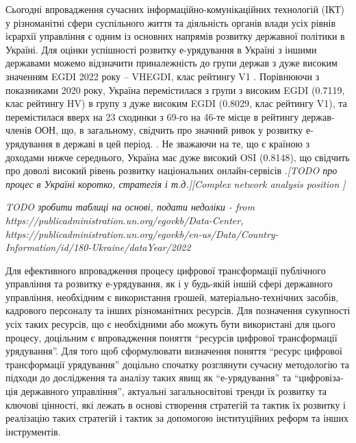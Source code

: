 Сьогодні впровадження сучасних інформаційно-комунікаційних технологій (ІКТ) у різноманітні сфери суспільного життя та діяльність органів влади усіх рівнів ієрархії управління є одним із основних напрямів розвитку державної політики в Україні. Для оцінки успішності розвитку е-урядування в Україні з іншими державами можемо відзначити приналежність до групи держав з дуже високим значенням EGDI 2022 року -- VHEGDI, клас рейтингу V1 \cite{online:egdi}. Порівнюючи з показниками 2020 року, Україна перемістилася з групи з високим EGDI (0.7119, клас рейтингу HV) в групу з дуже високим EGDI (0.8029, клас рейтингу V1), та перемістилася вверх на 23 сходинки з 69-го на 46-те місце в рейтингу держав-членів ООН, що, в загальному, свідчить про значний ривок у розвитку е-урядування в державі в цей період. \cite[36]{book:un_e_govt_survey_2022}. Не зважаючи на те, що є країною з доходами нижче середнього, Україна має дуже високий OSI (0.8148), що свідчить про доволі високий рівень розвитку національних онлайн-сервісів \cite[44]{book:un_e_govt_survey_2022}\cite{online:egdi}.\textit{[TODO про процес в Україні коротко, стратегія і т.д.]}\textit{[Complex network analysis position \cite[47]{book:un_e_govt_survey_2022}]}

\textit{TODO зробити таблиці на основі, подати недоліки - from https://publicadministration.un.org/egovkb/Data-Center, https://publicadministration.un.org/egovkb/en-us/Data/Country-Information/id/180-Ukraine/dataYear/2022}

Для ефективного впровадження процесу цифрової трансформації публічного управління та розвитку е-урядування, як і у будь-якій іншій сфері державного управління, необхідним є використання грошей, матеріально-технічних засобів, кадрового персоналу та інших різноманітних ресурсів. Для позначення сукупності усіх таких ресурсів, що є необхідними або можуть бути використані для цього процесу, доцільним є впровадження поняття \foreignquote{ukrainian}{ресурсів цифрової трансформації урядування}. Для того щоб сформулювати визначення поняття \foreignquote{ukrainian}{ресурс цифрової трансформації урядування} доцільно спочатку розглянути сучасну методологію та підходи до дослідження та аналізу таких явищ як \foreignquote{ukrainian}{е-урядування} та \foreignquote{ukrainian}{цифровізація державного управління}, актуальні загальносвітові тренди їх розвитку та ключові цінності, які лежать в основі створення стратегій та тактик їх розвитку і реалізацію таких стратегій і тактик за допомогою інституційних реформ та інших інструментів.

